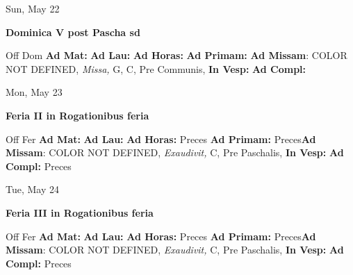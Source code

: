 \documentclass[10pt]{memoir}
\begin{document}
\begin{center}
\begin{minipage}{3.5in}
\vspace{2em}
\begin{center}Sun, May 22
\end{center}
\textbf{ \large Dominica V post Pascha
\textnormal{\normalsize sd}}

\begin{justify}Off Dom
\textbf{Ad Mat: }
\textbf{Ad Lau: }
\textbf{Ad Horas: }
\textbf{Ad Primam: }\textbf{Ad Missam}: COLOR NOT DEFINED, \textit{Missa,} G, C, Pre Communis, 
\textbf{In Vesp: }
\textbf{Ad Compl: }
\end{justify}
\end{minipage}
\end{center}

\begin{center}
\begin{minipage}{3.5in}
\vspace{2em}
\begin{center}Mon, May 23
\end{center}
\textbf{ \large Feria II in Rogationibus
\textnormal{\normalsize feria}}

\begin{justify}Off Fer
\textbf{Ad Mat: }
\textbf{Ad Lau: }
\textbf{Ad Horas: }Preces
\textbf{Ad Primam: }Preces\textbf{Ad Missam}: COLOR NOT DEFINED, \textit{Exaudivit,} C, Pre Paschalis, 
\textbf{In Vesp: }
\textbf{Ad Compl: }Preces
\end{justify}
\end{minipage}
\end{center}

\begin{center}
\begin{minipage}{3.5in}
\vspace{2em}
\begin{center}Tue, May 24
\end{center}
\textbf{ \large Feria III in Rogationibus
\textnormal{\normalsize feria}}

\begin{justify}Off Fer
\textbf{Ad Mat: }
\textbf{Ad Lau: }
\textbf{Ad Horas: }Preces
\textbf{Ad Primam: }Preces\textbf{Ad Missam}: COLOR NOT DEFINED, \textit{Exaudivit,} C, Pre Paschalis, 
\textbf{In Vesp: }
\textbf{Ad Compl: }Preces
\end{justify}
\end{minipage}
\end{center}
\end{document}
